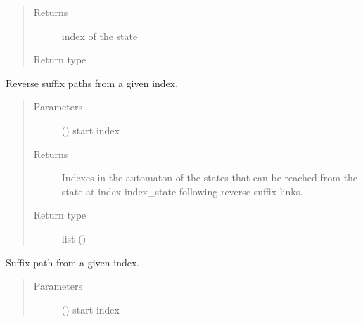 \documentclass[letterpaper,10pt,english]{sphinxmanual}
\begin{document}
\begin{fulllineitems}
\begin{fulllineitems}
\begin{quote}
\begin{description}
\item[{Returns}] \leavevmode
index of the state

\item[{Return type}] \leavevmode
{}

\end{description}\end{quote}

\end{fulllineitems}


\begin{fulllineitems}
\label{\detokenize{index:Model.FactorOracle.follow_reverse_suffix_links_from}}
Reverse suffix paths from a given index.
\begin{quote}\begin{description}
\item[{Parameters}] \leavevmode
{} () \textendash{} start index

\item[{Returns}] \leavevmode
Indexes in the automaton of the states that can be reached from the state at index index\_state following reverse suffix links.

\item[{Return type}] \leavevmode
list ()

\end{description}\end{quote}

\end{fulllineitems}


\begin{fulllineitems}
\label{\detokenize{index:Model.FactorOracle.follow_suffix_links_from}}
Suffix path from a given index.
\begin{quote}\begin{description}
\item[{Parameters}] \leavevmode
{} () \textendash{} start index


\end{description}
\end{quote}
\end{fulllineitems}
\end{fulllineitems}
\end{document}
